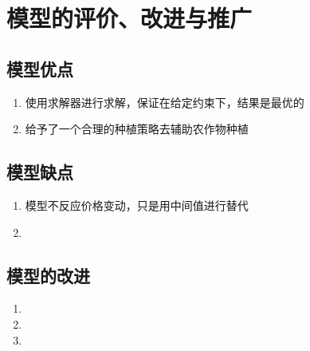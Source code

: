 \documentclass[a4paper]{article}
\begin{document}
	
%	
%	
%	
%				
%	
	
	
	\section{模型的评价、改进与推广}
	\subsection{模型优点}
	\begin{enumerate}
		\item 使用求解器进行求解，保证在给定约束下，结果是最优的
		\item 给予了一个合理的种植策略去辅助农作物种植
	\end{enumerate}
	
	\subsection{模型缺点}
	\begin{enumerate}
		\item 模型不反应价格变动，只是用中间值进行替代
		\item 
	\end{enumerate}
	
	\subsection{模型的改进}
	\begin{enumerate}
		\item 
		\item 
		\item 
	\end{enumerate}
	
\end{document}
